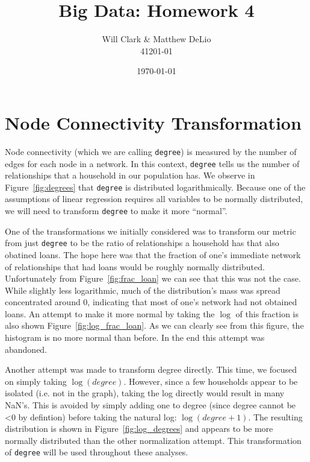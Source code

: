 \documentclass[11pt, fleqn]{article}
\begin{document}
\title{Big Data: Homework 4}
\author{Will Clark \& Matthew DeLio \\ 41201-01}
\date{\today}
\maketitle

\section{Node Connectivity Transformation}

Node connectivity (which we are calling \texttt{degree}) is measured by the number of edges for each node in a network. In this context, \texttt{degree} tells us the number of relationships that a household in our population has. We observe in Figure~\ref{fig:degrees} that \texttt{degree} is distributed logarithmically.  Because one of the assumptions of linear regression requires all variables to be normally distributed, we will need to transform \texttt{degree} to make it more ``normal''.

One of the transformations we initially considered was to transform our metric from just \texttt{degree} to be the ratio of relationships a household has that also obatined loans.  The hope here was that the fraction of one's immediate network of relationships that had loans would be roughly normally distributed.  Unfortunately from Figure~\ref{fig:frac_loan} we can see that this was not the case.  While slightly less logarithmic, much of the distribution's mass was spread concentrated around 0, indicating that most of one's network had not obtained loans.  An attempt to make it more normal by taking the $\log$ of this fraction is also shown Figure~\ref{fig:log_frac_loan}.  As we can clearly see from this figure, the histogram is no more normal than before.  In the end this attempt was abandoned.

Another attempt was made to transform degree directly.  This time, we focused on simply taking $\log(degree)$.  However, since a few households appear to be isolated (i.e. not in the graph), taking the log directly would result in many NaN's.  This is avoided by simply adding one to degree (since degree cannot be <0 by defintion) before taking the natural log: $\log(degree+1)$.  The resulting distribution is shown in Figure~\ref{fig:log_degrees} and appears to be more normally distributed than the other normalization attempt.  This transformation of \texttt{degree} will be used throughout these analyses.
\end{document}
